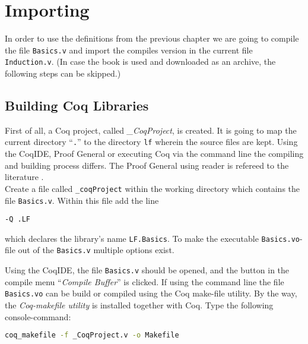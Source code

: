 \section{Importing}


In order to use the definitions from the previous chapter we are going to compile the file 
\texttt{Basics.v} and import the compiles version in the current file \texttt{Induction.v}.
(In case the book \cite{PACGGHSY} is used and downloaded as an archive, the following steps can be skipped.)   

\subsection{Building Coq Libraries}

First of all, a Coq project, called {\itshape \_CoqProject}, is created.  
It is going to map the current directory ``\texttt{.}'' to the directory \texttt{lf} wherein the source files are kept.
Using the CoqIDE, Proof General or executing Coq via the command line the compiling and building process differs.
The Proof General using reader is refereed to the literature \cite[Section, Induction, Proof by Induction]{PACGGHSY}.\\

Create a file called \texttt{\_coqProject} within the working directory which contains the file \texttt{Basics.v}.
Within this file add the line 

\begin{lstlisting}[caption = \lstinline!naming a library!]
-Q .LF
\end{lstlisting}

which declares the library's name \texttt{LF.Basics}. 
To make the executable \texttt{Basics.vo}-file out of the \texttt{Basics.v} multiple options exist.

Using the CoqIDE, the file \texttt{Basics.v} should be opened, and the button in the compile menu  ``{\itshape Compile Buffer}'' is clicked.
If using the command line the file \texttt{Basics.vo} can be build or compiled using the Coq  make-file utility.
By the way, the {\itshape Coq-makefile utility } is installed together with Coq.
Type the following console-command:
\begin{lstlisting}[language=bash, caption = \lstinline!coq-makefile!, label = lst:coq-makefile]
coq_makefile -f _CoqProject.v -o Makefile
\end{lstlisting}

